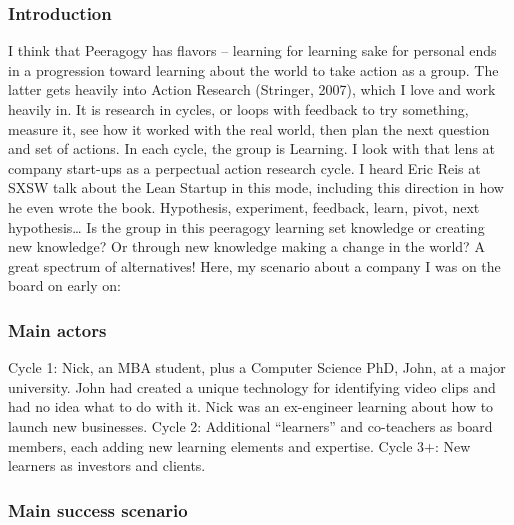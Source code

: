 \subsubsection{Introduction}

I think that Peeragogy has flavors -- learning for learning sake for
personal ends in a progression toward learning about the world to take
action as a group. The latter gets heavily into Action Research
(Stringer, 2007), which I love and work heavily in. It is research in
cycles, or loops with feedback to try something, measure it, see how it
worked with the real world, then plan the next question and set of
actions. In each cycle, the group is Learning. I look with that lens at
company start-ups as a perpectual action research cycle. I heard Eric
Reis at SXSW talk about the Lean Startup in this mode, including this
direction in how he even wrote the book. Hypothesis, experiment,
feedback, learn, pivot, next hypothesis\ldots{} Is the group in this
peeragogy learning set knowledge or creating new knowledge? Or through
new knowledge making a change in the world? A great spectrum of
alternatives! Here, my scenario about a company I was on the board on
early on:

\subsubsection{Main actors}

Cycle 1: Nick, an MBA student, plus a Computer Science PhD, John, at a
major university. John had created a unique technology for identifying
video clips and had no idea what to do with it. Nick was an ex-engineer
learning about how to launch new businesses. Cycle 2: Additional
``learners'' and co-teachers as board members, each adding new learning
elements and expertise. Cycle 3+: New learners as investors and clients.

\subsubsection{Main success scenario}

